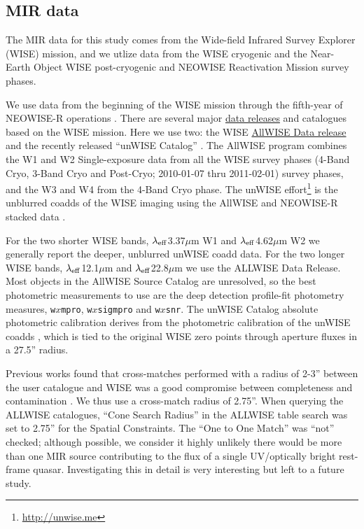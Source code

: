 \documentclass[usenatbib]{mnras}
\begin{document}
\subsection{MIR data}
The MIR data for this study comes from the Wide-field Infrared Survey Explorer (WISE) mission, and we utlize data from the WISE cryogenic and the Near-Earth Object WISE \citep[NEOWISE; ][]{Mainzer2011} post-cryogenic and NEOWISE Reactivation Mission \citep[NEOWISE-R][]{Mainzer2014} survey phases.

We use data from the beginning of the WISE mission \citep[2010 January; ][]{Wright2010} through the fifth-year of NEOWISE-R operations \citep[2018 December;]{Mainzer2011}.  There are several  major \href{https://irsa.ipac.caltech.edu/Missions/wise.html}{data releases} and catalogues based on the WISE mission. Here we use two: the WISE \href{http://wise2.ipac.caltech.edu/docs/release/allwise/}{AllWISE Data release} and the recently released ``unWISE Catalog'' \citet{Schlafly2019}. The AllWISE program combines the W1 and W2 Single-exposure data from all the WISE survey phases (4-Band Cryo, 3-Band Cryo and Post-Cryo; 2010-01-07 thru 2011-02-01) survey phases, and the W3 and W4 from the 4-Band Cryo phase. The unWISE effort\footnote{\href{http://unwise.me}{http://unwise.me}} is the unblurred coadds of the WISE imaging using the AllWISE and NEOWISE-R stacked data \citep{Lang2014, Meisner2018a, Meisner2018b}.

For the two shorter WISE bands, $\lambda_{\rm eff}$3.37$\mu$m W1 and $\lambda_{\rm eff}$4.62$\mu$m W2 we generally report the deeper, unblurred unWISE coadd data.  For the two longer WISE bands, $\lambda_{\rm eff}$12.1$\mu$m and $\lambda_{\rm eff}$22.8$\mu$m we use the ALLWISE Data Release.  Most objects in the AllWISE Source Catalog are unresolved, so the best photometric measurements to use are the deep detection profile-fit photometry measures,  {\tt w$x$mpro},  {\tt w$x$sigmpro} and  {\tt w$x$snr}. The unWISE Catalog absolute photometric calibration derives from the photometric calibration of the unWISE coadds \citep{Meisner2017a}, which is tied to the original WISE zero points through aperture fluxes in a 27.5'' radius. 

Previous works \citep[e.g., ][]{Krawczyk2013, Ross2015, Bilicki2016} found that cross-matches performed with a radius of 2-3'' between the user catalogue and WISE was a good compromise between completeness and contamination \citep[see e.g. Figure 4 of ][]{Krawczyk2013}. We thus use a cross-match radius of 2.75''. When querying the ALLWISE catalogues, ``Cone Search Radius'' in the ALLWISE table search was set to 2.75'' for the Spatial Constraints. The ``One to One Match'' was ``not'' checked; although possible, we consider it highly unlikely there would be more than one MIR source contributing to the flux of a single UV/optically bright rest-frame quasar. Investigating this in detail is very interesting but left to a future study. 
\end{document}
